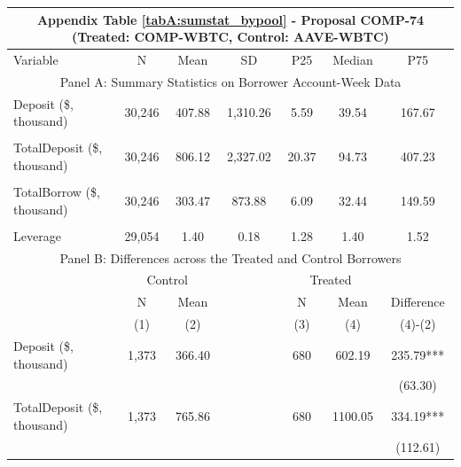 \clearpage
\newpage
\begin{table}[ht!]
\footnotesize 

\centering
\def\sym#1{\ifmmode^{#1}\else\(^{#1}\)\fi}


\begin{tabular*}{\linewidth}{@{\extracolsep{\fill}}lcccccc }
      \multicolumn{7}{c}{Appendix Table \ref{tabA:sumstat_bypool} - Proposal COMP-74 (Treated: COMP-WBTC, Control: AAVE-WBTC)} \\
    \toprule
     Variable  &N & Mean & SD & P25 & Median & P75 \\
     \midrule
    \multicolumn{7}{c}{Panel A: Summary Statistics on Borrower Account-Week Data} \\
    \midrule
    Deposit (\$, thousand) & 30,246 & 407.88 & 1,310.26 & 5.59  & 39.54 & 167.67 \\
          &       &       &       &       &       &  \\
    TotalDeposit (\$, thousand) & 30,246 & 806.12 & 2,327.02 & 20.37 & 94.73 & 407.23 \\
          &       &       &       &       &       &  \\
    TotalBorrow (\$, thousand) & 30,246 & 303.47 & 873.88 & 6.09  & 32.44 & 149.59 \\
          &       &       &       &       &       &  \\
    Leverage & 29,054 & 1.40  & 0.18  & 1.28  & 1.40  & 1.52 \\
    \midrule
        \multicolumn{7}{c}{Panel B: Differences across the Treated and Control Borrowers} \\
\midrule
          & \multicolumn{2}{c}{Control} &       & \multicolumn{2}{c}{Treated} &  \\
\cmidrule{2-3}\cmidrule{5-6}          & N & Mean &       & N & Mean & Difference \\
\cmidrule{2-3}\cmidrule{5-6}          & (1) & (2) &       & (3) & (4) & (4)-(2) \\
\cmidrule{2-7}    Deposit (\$, thousand) & 1,373 & 366.40 &       & 680   & 602.19 & 235.79*** \\
          &       &       &       &       &       & (63.30) \\
    TotalDeposit (\$, thousand) & 1,373 & 765.86 &       & 680   & 1100.05 & 334.19*** \\
          &       &       &       &       &       & (112.61) \\

\end{tabular*}
\end{table}
